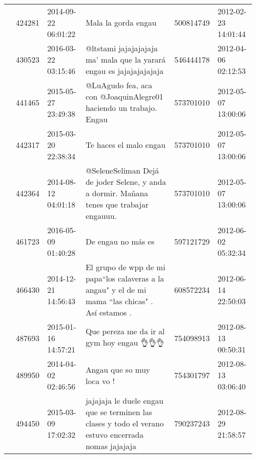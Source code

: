 \begin{tabular}{llllrl}
           & 424281  & 2014-09-22 06:01:22 &                                                                                                                          Mala la gorda engau &   500814749 & 2012-02-23 14:01:44 \\
           & 430523  & 2016-03-22 03:15:46 &                                                                         @ltstami jajajajajaja ma' mala que la yarará engau es jajajajajajaja &   546444178 & 2012-04-06 02:12:53 \\
           & 441465  & 2015-05-27 23:49:38 &                                                                            @LuAgudo fea, aca con @JoaquinAlegre01 haciendo un trabajo. Engau &   573701010 & 2012-05-07 13:00:06 \\
           & 442317  & 2015-03-20 22:38:34 &                                                                                                                       Te haces el malo engau &   573701010 & 2012-05-07 13:00:06 \\
           & 442364  & 2014-08-12 04:01:18 &                                                     @SeleneSeliman Dejá de joder Selene, y anda a dormir. Mañana tenes que trabajar engauuu. &   573701010 & 2012-05-07 13:00:06 \\
           & 461723  & 2016-05-09 01:40:28 &                                                                                                                           De engau no más es &   597121729 & 2012-06-02 05:32:34 \\
           & 466430  & 2014-12-21 14:56:43 &                                            El grupo de wpp de mi papa“los calaveras a la angau" y el de mi mama “las chicas" . Así estamos . &   608572234 & 2012-06-14 22:50:03 \\
           & 487693  & 2015-01-16 14:57:21 &                                                                                                     Que pereza me da ir al gym hoy engau 👌👌👌 &   754098913 & 2012-08-13 00:50:31 \\
           & 489950  & 2014-04-02 02:46:56 &                                                                                                                   Angau que so muy loca vo ! &   754301797 & 2012-08-13 03:06:40 \\
           & 494450  & 2015-03-09 17:02:32 &                                          jajajaja le duele engau que se terminen las clases y todo el verano estuvo encerrada nomas jajajaja &   790237243 & 2012-08-29 21:58:57 \\

\end{tabular}
